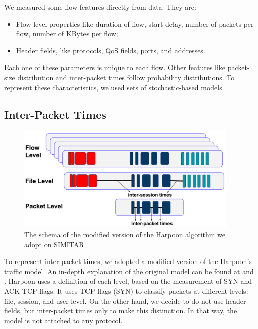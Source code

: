 We measured some flow-features directly from data. They are:

\begin{itemize}
\item Flow-level properties like duration of flow, start delay, number of packets per flow, number of KBytes per flow;
\item Header fields, like protocols, QoS fields, ports, and addresses.
\end{itemize}

Each one of these parameters is unique to each flow. Other features like packet-size distribution and inter-packet times follow probability distributions. To represent these characteristics, we used sets of stochastic-based models.

\subsection{Inter-Packet Times}


\begin{figure}[ht!]
    \centering
    \includegraphics[height=2.0in]{figures/ch3/modified-harpoon-model}
    \caption{The schema of the modified version of the Harpoon algorithm we adopt on SIMITAR.}
    \label{fig:modified-harpoon-model}
\end{figure}


To represent inter-packet times, we adopted a modified version of the Harpoon’s traffic model. An in-depth explanation of the original model can be found at  \cite{harpoon-paper} and \cite{harpoon-validation}. Harpoon uses a definition of each level, based on the measurement of \acrshort{SYN} and \acrshort{ACK} TCP flags. It uses TCP flags (SYN) to classify packets at different levels: file, session, and user level. On the other hand, we decide to do not use header fields, but inter-packet times only to make this distinction. In that way, the model is not attached to any protocol. 

